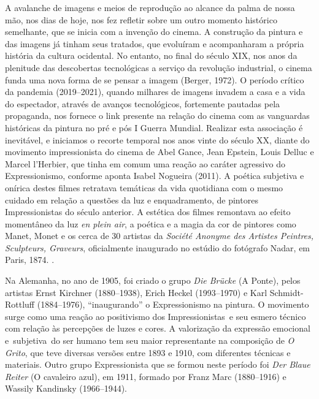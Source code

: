 A avalanche de imagens e meios de reprodução ao alcance da palma de
nossa mão, nos dias de hoje, nos fez refletir sobre um outro momento
histórico semelhante, que se inicia com a invenção do cinema. A
construção da pintura e das imagens já tinham seus tratados, que
evoluíram e acompanharam a própria história da cultura ocidental. No
entanto, no final do século XIX, nos anos da plenitude das descobertas
tecnológicas a serviço da revolução industrial, o cinema funda uma nova
forma de se pensar a imagem (Berger, 1972). O período crítico da
pandemia (2019--2021), quando milhares de imagens invadem a casa e a
vida do espectador, através de avanços tecnológicos, fortemente
pautadas pela propaganda, nos fornece o link presente na relação do
cinema com as vanguardas históricas da pintura no pré e pós I Guerra
Mundial. Realizar esta associação é inevitável, e iniciamos o recorte
temporal nos anos vinte do século XX, diante do movimento
impressionista do cinema de Abel Gance, Jean Epstein, Louis Delluc e
Marcel l'Herbier, que tinha em comum uma reação ao caráter agressivo do
Expressionismo, conforme aponta Isabel Nogueira (2011). A poética
subjetiva e onírica destes filmes retratava temáticas da vida
quotidiana com o mesmo cuidado em relação a questões da luz e
enquadramento, de pintores Impressionistas do século anterior. A
estética dos filmes remontava ao efeito momentâneo da luz \emph{en
	plein air}, a poética e a magia da cor de pintores como Manet, Monet e
os cerca de 30 artistas da \emph{Société Anonyme des Artistes Peintres,
	Sculpteurs, Graveurs}, oficialmente inaugurado no estúdio do fotógrafo
Nadar, em Paris, 1874. \parencite{nogueira2011cinema}.

Na Alemanha, no ano de 1905, foi criado o grupo \emph{Die Brücke} (A
Ponte), pelos artistas Ernst Kirchner (1880--1938), Erich Heckel
(1993--1970) e Karl Schmidt-Rottluff (1884--1976),
\enquote{inaugurando} o Expressionismo na pintura. O movimento surge
como uma reação ao positivismo dos Impressionistas~e seu esmero técnico
com relação às percepções de luzes e cores. A valorização da expressão
emocional e~subjetiva~do ser humano tem seu maior representante na
composição de \emph{O Grito}, que teve diversas versões entre 1893 e
1910, com diferentes técnicas e materiais. Outro grupo Expressionista
que se formou neste período foi \emph{Der Blaue Reiter} (O cavaleiro
azul), em 1911, formado por Franz Marc (1880--1916) e Wassily Kandinsky
(1966--1944).

